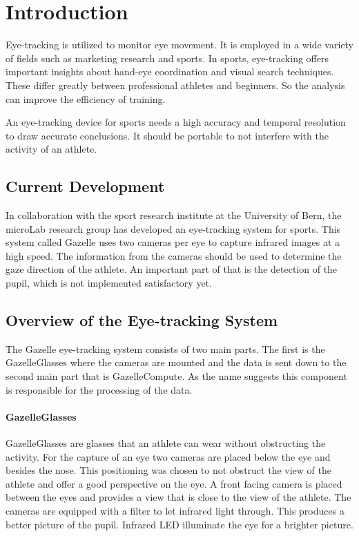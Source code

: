 \chapter{Introduction}

\label{chap:introduction}
Eye-tracking is utilized to monitor eye movement. It is employed in a wide variety of fields such as marketing research and sports. In sports, eye-tracking offers important insights about hand-eye coordination and visual search techniques. These differ greatly between professional athletes and beginners. So the analysis can improve the efficiency of training.

An eye-tracking device for sports needs a high accuracy and temporal resolution to draw accurate conclusions. It should be portable to not interfere with the activity of an athlete.

\section{Current Development}
In collaboration with the sport research institute at the University of Bern, the microLab research group has developed an eye-tracking system for sports. This system called Gazelle uses two cameras per eye to capture infrared images at a high speed. The information from the cameras should be used to determine the gaze direction of the athlete. An important part of that is the detection of the pupil, which is not implemented satisfactory yet.\cite{retoDamian}


\section{Overview of the Eye-tracking System}
The Gazelle eye-tracking system consists of two main parts. The first is the GazelleGlasses where the cameras are mounted and the data is sent down to the second main part that is GazelleCompute. As the name suggests this component is responsible for the processing of the data.

\subsubsection{GazelleGlasses}
GazelleGlasses are glasses that an athlete can wear without obstructing the activity.
For the capture of an eye two cameras are placed below the eye and besides the nose. This positioning was chosen to not obstruct the view of the athlete and offer a good perspective on the eye. A front facing camera is placed between the eyes and provides a view that is close to the view of the athlete. The cameras are equipped with a filter to let infrared light through. This produces a better picture of the pupil. Infrared \gls{LED} illuminate the eye for a brighter picture.

